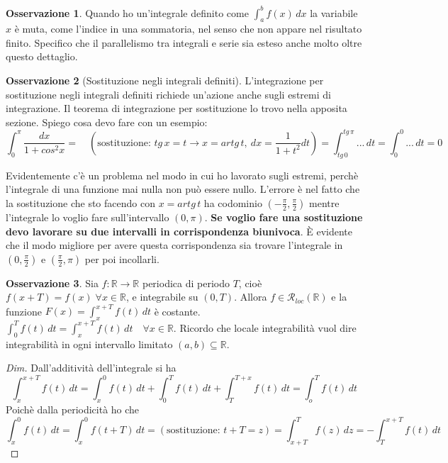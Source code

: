 \documentclass{article}
\theoremstyle{definition}
\theoremstyle{definition}
\theoremstyle{definition}
\theoremstyle{definition}
\newtheorem{remark}{Osservazione}[section]
\theoremstyle{definition}
\theoremstyle{definition}
\begin{document}
\begin{remark}
    Quando ho un'integrale definito come $\displaystyle{\int_a^b f(x)\,dx}$ la variabile $x$ è muta, come l'indice in una sommatoria, nel senso che non appare nel risultato finito. Specifico che il parallelismo tra integrali e serie sia esteso anche molto oltre questo dettaglio.
\end{remark}

\begin{remark}[Sostituzione negli integrali definiti]
    L'integrazione per sostituzione negli integrali definiti richiede un'azione anche sugli estremi di integrazione. Il teorema di integrazione per sostituzione lo trovo nella apposita sezione. Spiego cosa devo fare con un esempio:
    \[\int_0^\pi \frac{dx}{1+cos^2x}=\quad (\text{sostituzione: } tg\,x = t \rightarrow x=artg\,t, \:dx=\frac{1}{1+t^2}dt)=\int_{tg\,0}^{tg\,\pi}...\,dt=\int_0^0...\,dt=0\]

    Evidentemente c'è un problema nel modo in cui ho lavorato sugli estremi, perchè l'integrale di una funzione mai nulla non può essere nullo. L'errore è nel fatto che la sostituzione che sto facendo con $x=artg\,t$ ha codominio $(-\frac{\pi}{2}, \frac{\pi}{2})$ mentre l'integrale lo voglio fare sull'intervallo $(0,\pi)$. \textbf{Se voglio fare una sostituzione devo lavorare su due intervalli in corrispondenza biunivoca}. È evidente che il modo migliore per avere questa corrispondenza sia trovare l'integrale in $(0,\frac{\pi}{2})$ e $(\frac{\pi}{2},\pi)$ per poi incollarli.
\end{remark}

\begin{remark}
    Sia $f:\mathbb{R}\rightarrow\mathbb{R}$ periodica di periodo $T$, cioè $f(x+T)=f(x)\;\forall x\in\mathbb{R}$, e integrabile su $(0,T)$. Allora $f\in\mathcal{R}_{loc}(\mathbb{R})$ e la funzione $\displaystyle{F(x)=\int_x^{x+T}f(t)\,dt}$ è costante. $\displaystyle{\int_0^T f(t)\,dt=\int_x^{x+T}f(t)\,dt \quad \forall x\in\mathbb{R}}$. Ricordo che locale integrabilità vuol dire integrabilità in ogni intervallo limitato $(a,b)\subseteq\mathbb{R}$.
    \begin{proof}[Dim]
        Dall'additività dell'integrale si ha
        \[\int_x^{x+T}f(t)\,dt=\int_x^0 f(t)\,dt + \int_0^T f(t)\,dt + \int_T^{T+x}f(t)\,dt = \int_o^T f(t)\,dt\]
        Poichè dalla periodicità ho che 
        \[\int_x^0 f(t)\,dt=\int_x^0 f(t+T)\, dt = (\text{sostituzione: }t+T=z) = \int_{x+T}^T f(z)\,dz = -\int_T^{x+T} f(t)\,dt\]
    \end{proof}
\end{remark}
\end{document}
